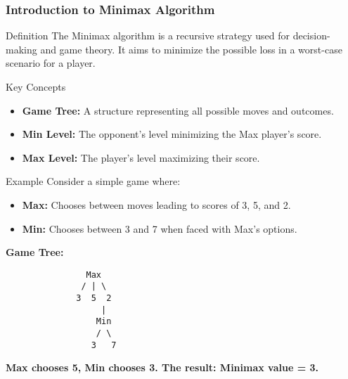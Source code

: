 \documentclass[aspectratio=169]{beamer}
\begin{document}
\begin{frame}[fragile]
    \frametitle{Introduction to Minimax Algorithm}
    \begin{block}{Definition}
        The Minimax algorithm is a recursive strategy used for decision-making and game theory. It aims to minimize the possible loss in a worst-case scenario for a player.
    \end{block}
    \begin{block}{Key Concepts}
        \begin{itemize}
            \item \textbf{Game Tree:} A structure representing all possible moves and outcomes.
            \item \textbf{Min Level:} The opponent's level minimizing the Max player's score.
            \item \textbf{Max Level:} The player's level maximizing their score.
        \end{itemize}
    \end{block}
    
    \begin{block}{Example}
        Consider a simple game where:
        \begin{itemize}
            \item \textbf{Max:} Chooses between moves leading to scores of 3, 5, and 2.
            \item \textbf{Min:} Chooses between 3 and 7 when faced with Max’s options.
        \end{itemize}
        
        \textbf{Game Tree:}
        \begin{verbatim}
                Max
               / | \
              3  5  2
                   |
                  Min
                  / \
                 3   7
        \end{verbatim}
        
        \textbf{Max chooses 5, Min chooses 3. The result: Minimax value = 3.}
    \end{block}
\end{frame}
\end{document}
